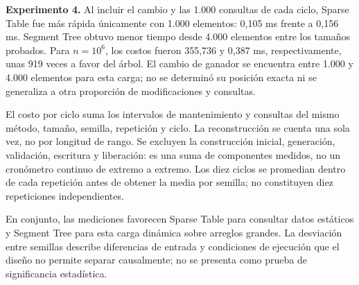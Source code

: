 \textbf{Experimento 4.} Al incluir el cambio y las 1.000 consultas de cada
ciclo, Sparse Table fue más rápida únicamente con 1.000 elementos:
0,105 ms frente a 0,156 ms. Segment Tree obtuvo menor tiempo desde
4.000 elementos entre los tamaños probados. Para \(n=10^6\), los costos
fueron 355,736 y 0,387 ms, respectivamente, unas 919 veces a favor del árbol.
El cambio de ganador se encuentra entre 1.000 y 4.000 elementos para
esta carga; no se determinó su posición exacta ni se generaliza a otra
proporción de modificaciones y consultas.

El costo por ciclo suma los intervalos de mantenimiento y consultas del
mismo método, tamaño, semilla, repetición y ciclo. La reconstrucción se
cuenta una sola vez, no por longitud de rango. Se excluyen la construcción
inicial, generación, validación, escritura y liberación: es una suma de
componentes medidos, no un cronómetro continuo de extremo a extremo.
Los diez ciclos se promedian dentro de cada repetición antes de obtener
la media por semilla; no constituyen diez repeticiones independientes.

En conjunto, las mediciones favorecen Sparse Table para consultar datos
estáticos y Segment Tree para esta carga dinámica sobre arreglos grandes.
La desviación entre semillas describe diferencias de entrada y condiciones
de ejecución que el diseño no permite separar causalmente; no se presenta
como prueba de significancia estadística.

\clearpage

\endgroup
